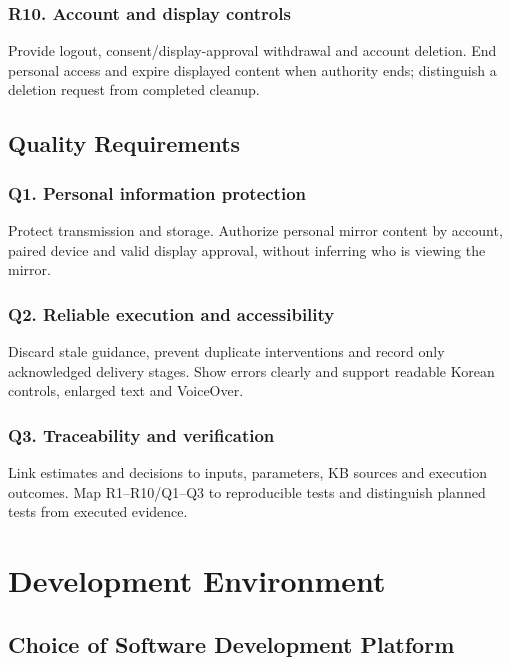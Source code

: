 \documentclass[conference,letterpaper]{IEEEtran}
\begin{document}
\subsubsection*{R10. Account and display controls}

Provide logout, consent/display-approval withdrawal and account deletion. End personal access and expire displayed content when authority ends; distinguish a deletion request from completed cleanup.

\subsection{Quality Requirements}

\subsubsection*{Q1. Personal information protection}

Protect transmission and storage. Authorize personal mirror content by account, paired device and valid display approval, without inferring who is viewing the mirror.

\subsubsection*{Q2. Reliable execution and accessibility}

Discard stale guidance, prevent duplicate interventions and record only acknowledged delivery stages. Show errors clearly and support readable Korean controls, enlarged text and VoiceOver.

\subsubsection*{Q3. Traceability and verification}

Link estimates and decisions to inputs, parameters, KB sources and execution outcomes. Map R1--R10/Q1--Q3 to reproducible tests and distinguish planned tests from executed evidence.
\section{Development Environment}

\subsection{Choice of Software Development Platform}
\end{document}

